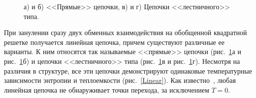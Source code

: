 \documentclass[utf8,12pt]{jetp}
\begin{document}
\begin{figure}[h]
\begin{minipage}{0.45\linewidth}
	\end{minipage}
	\hfill
	\begin{minipage}{0.45\linewidth}
	\end{minipage}
	\caption{а) и б) <<Прямые>> цепочки, в) и г) Цепочки <<лестничного>> типа.}
	\label{linearChains}
\end{figure}

При занулении сразу двух обменных взаимодействия на обобщенной квадратной решетке получается линейная цепочка, причем существуют различные ее варианты. К ним относятся так называемые <<прямые>> цепочки (рис.~\ref{linearChains}а и рис.~\ref{linearChains}б) и цепочки <<лестничного>> типа (рис.~\ref{linearChains}в и рис.~\ref{linearChains}г). Несмотря на различия в структуре, все эти цепочки демонстрируют одинаковые температурные зависимости энтропии и теплоемкости (рис.~\ref{Linear}). Как известно~\cite{mussardo2010}, любая линейная цепочка не обнаруживает точки перехода, за исключением $T=0$.
\end{document}
